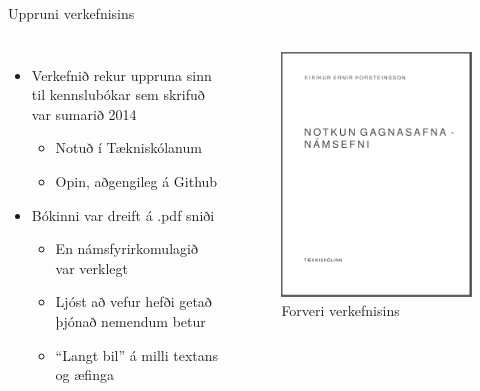 \documentclass{beamer}
\begin{document}
\begin{frame}{Uppruni verkefnisins}
    \begin{columns}
        \begin{itemize}
            \item Verkefnið rekur uppruna sinn til kennslubókar sem skrifuð var sumarið 2014
            \begin{itemize}
                \item Notuð í Tækniskólanum
                \item Opin, aðgengileg á Github
            \end{itemize}
            \item Bókinni var dreift á .pdf sniði
            \begin{itemize}
                \item En námsfyrirkomulagið var verklegt
                \item Ljóst að vefur hefði getað þjónað nemendum betur
                \item ``Langt bil'' á milli textans og æfinga
            \end{itemize}
        \end{itemize}
        \begin{figure}
            \caption{Forveri verkefnisins}
            \includegraphics[width=\textwidth]{notkun-gagnasafna}
        \end{figure}
    \end{columns}
\end{frame}
\end{document}
